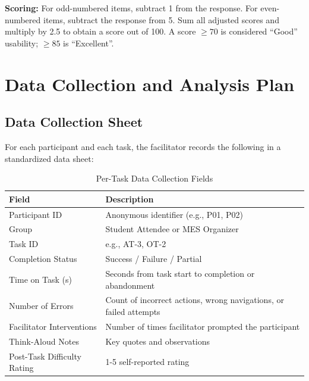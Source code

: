 \documentclass[12pt, titlepage]{article}
\begin{document}
\noindent\textbf{Scoring:} For odd-numbered items, subtract 1 from the response. For even-numbered items, subtract the response from 5. Sum all adjusted scores and multiply by 2.5 to obtain a score out of 100. A score $\geq 70$ is considered ``Good'' usability; $\geq 85$ is ``Excellent''.










\section{Data Collection and Analysis Plan}


\subsection{Data Collection Sheet}


For each participant and each task, the facilitator records the following in a standardized data sheet:


\begin{table}[H]
\centering
\caption{Per-Task Data Collection Fields}
\begin{tabularx}{\textwidth}{p{4cm}X}
\toprule
\textbf{Field} & \textbf{Description} \\
\midrule
Participant ID & Anonymous identifier (e.g., P01, P02) \\
Group & Student Attendee or MES Organizer \\
Task ID & e.g., AT-3, OT-2 \\
Completion Status & Success / Failure / Partial \\
Time on Task (s) & Seconds from task start to completion or abandonment \\
Number of Errors & Count of incorrect actions, wrong navigations, or failed attempts \\
Facilitator Interventions & Number of times facilitator prompted the participant \\
Think-Aloud Notes & Key quotes and observations \\
Post-Task Difficulty Rating & 1-5 self-reported rating \\
\bottomrule
\end{tabularx}
\end{table}
\end{document}
